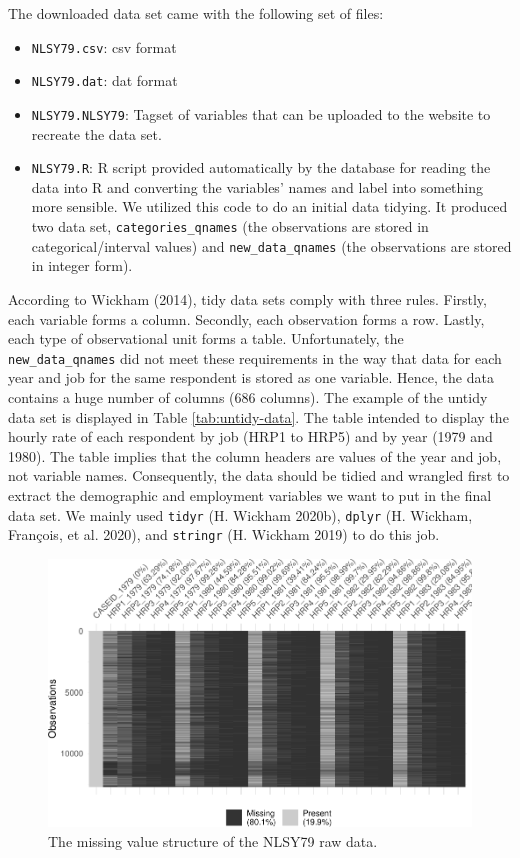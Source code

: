 \documentclass{article}
\begin{document}
The downloaded data set came with the following set of files:

\begin{itemize}
\tightlist
\item
  \texttt{NLSY79.csv}: csv format
\item
  \texttt{NLSY79.dat}: dat format
\item
  \texttt{NLSY79.NLSY79}: Tagset of variables that can be uploaded to the website to recreate the data set.
\item
  \texttt{NLSY79.R}: R script provided automatically by the database for reading the data into R and converting the variables' names and label into something more sensible. We utilized this code to do an initial data tidying. It produced two data set, \texttt{categories\_qnames} (the observations are stored in categorical/interval values) and \texttt{new\_data\_qnames} (the observations are stored in integer form).
\end{itemize}

According to Wickham (2014), tidy data sets comply with three rules. Firstly, each variable forms a column. Secondly, each observation forms a row. Lastly, each type of observational unit forms a table. Unfortunately, the \texttt{new\_data\_qnames} did not meet these requirements in the way that data for each year and job for the same respondent is stored as one variable. Hence, the data contains a huge number of columns (686 columns). The example of the untidy data set is displayed in Table \ref{tab:untidy-data}. The table intended to display the hourly rate of each respondent by job (HRP1 to HRP5) and by year (1979 and 1980). The table implies that the column headers are values of the year and job, not variable names. Consequently, the data should be tidied and wrangled first to extract the demographic and employment variables we want to put in the final data set. We mainly used \texttt{tidyr} (H. Wickham 2020b), \texttt{dplyr} (H. Wickham, François, et al. 2020), and \texttt{stringr} (H. Wickham 2019) to do this job.

\begin{figure}

{\centering \includegraphics[width=468px]{figures/untidy-data-1} 

}

\caption{The missing value structure of the NLSY79 raw data.}\label{fig:untidy-data}
\end{figure}
\end{document}
